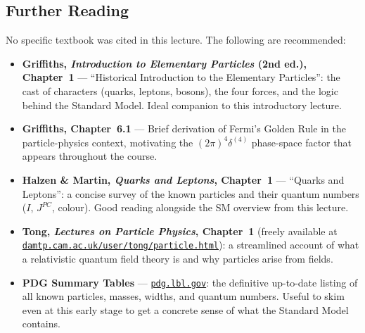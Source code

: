 \subsection*{Further Reading}

No specific textbook was cited in this lecture.  The following are recommended:

\begin{itemize}
  \item \textbf{Griffiths, \textit{Introduction to Elementary Particles} (2nd ed.), Chapter~1}
    — ``Historical Introduction to the Elementary Particles'': the cast of
    characters (quarks, leptons, bosons), the four forces, and the logic behind
    the Standard Model.  Ideal companion to this introductory lecture.

  \item \textbf{Griffiths, Chapter~6.1} — Brief derivation of Fermi's Golden Rule
    in the particle-physics context, motivating the $(2\pi)^4\delta^{(4)}$ phase-space
    factor that appears throughout the course.

  \item \textbf{Halzen \& Martin, \textit{Quarks and Leptons}, Chapter~1}
    — ``Quarks and Leptons'': a concise survey of the known particles and their
    quantum numbers ($I$, $J^{PC}$, colour).  Good reading alongside the SM overview
    from this lecture.

  \item \textbf{Tong, \textit{Lectures on Particle Physics}, Chapter~1}
    (freely available at
    \href{https://www.damtp.cam.ac.uk/user/tong/particle.html}{\texttt{damtp.cam.ac.uk/user/tong/particle.html}}):
    a streamlined account of what a relativistic quantum field theory is and why
    particles arise from fields.

  \item \textbf{PDG Summary Tables} —
    \href{https://pdg.lbl.gov/2023/tables/contents_tables.html}{\texttt{pdg.lbl.gov}}:
    the definitive up-to-date listing of all known particles, masses, widths, and
    quantum numbers.  Useful to skim even at this early stage to get a concrete
    sense of what the Standard Model contains.
\end{itemize}


